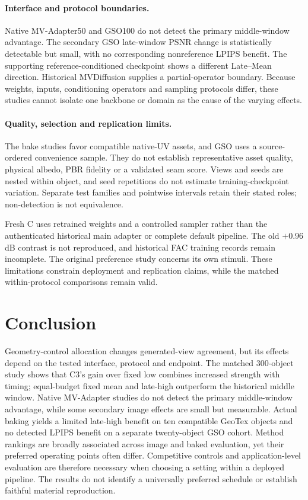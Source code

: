 \documentclass[times,twocolumn,final]{elsarticle}
\begin{document}
\paragraph{Interface and protocol boundaries.}
Native MV-Adapter50 and GSO100 do not detect the primary middle-window advantage. The secondary GSO late-window PSNR change is statistically detectable but small, with no corresponding nonreference LPIPS benefit. The supporting reference-conditioned checkpoint shows a different Late--Mean direction. Historical MVDiffusion supplies a partial-operator boundary. Because weights, inputs, conditioning operators and sampling protocols differ, these studies cannot isolate one backbone or domain as the cause of the varying effects.

\paragraph{Quality, selection and replication limits.}
The bake studies favor compatible native-UV assets, and GSO uses a source-ordered convenience sample. They do not establish representative asset quality, physical albedo, PBR fidelity or a validated seam score. Views and seeds are nested within object, and seed repetitions do not estimate training-checkpoint variation. Separate test families and pointwise intervals retain their stated roles; non-detection is not equivalence.

Fresh C uses retrained weights and a controlled sampler rather than the authenticated historical main adapter or complete default pipeline. The old $+0.96$ dB contrast is not reproduced, and historical FAC training records remain incomplete. The original preference study concerns its own stimuli. These limitations constrain deployment and replication claims, while the matched within-protocol comparisons remain valid.

\section{Conclusion}
\label{sec:conclusion}

Geometry-control allocation changes generated-view agreement, but its effects depend on the tested interface, protocol and endpoint. The matched 300-object study shows that C3's gain over fixed low combines increased strength with timing; equal-budget fixed mean and late-high outperform the historical middle window. Native MV-Adapter studies do not detect the primary middle-window advantage, while some secondary image effects are small but measurable. Actual baking yields a limited late-high benefit on ten compatible GeoTex objects and no detected LPIPS benefit on a separate twenty-object GSO cohort. Method rankings are broadly associated across image and baked evaluation, yet their preferred operating points often differ. Competitive controls and application-level evaluation are therefore necessary when choosing a setting within a deployed pipeline. The results do not identify a universally preferred schedule or establish faithful material reproduction.
\end{document}
